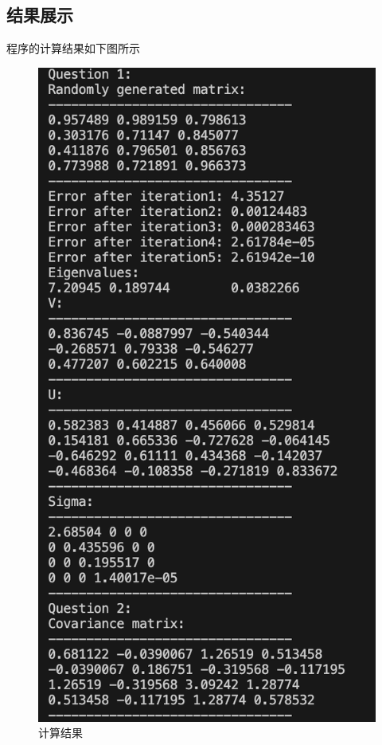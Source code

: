 \documentclass[UTF8]{ctexart}
\begin{document}
\subsection{结果展示}
程序的计算结果如下图所示
\begin{figure}[H]
  \centering
  \includegraphics[scale=0.4]{program.png}
  \caption{计算结果}
\end{figure}
\end{document}
